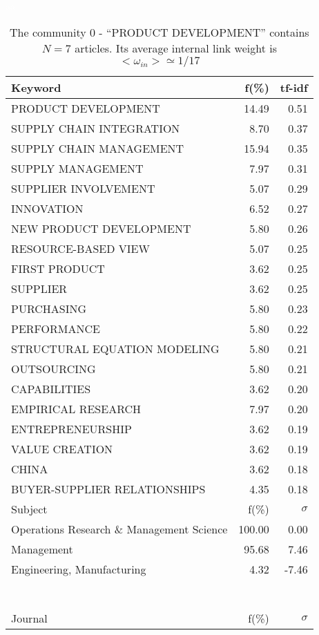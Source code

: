 \documentclass[a4paper,11pt]{report}
\begin{document}
\begin{landscape}
\begin{table}[!ht]
\caption{The community 0 - ``PRODUCT DEVELOPMENT'' contains $N = 7$ articles. Its average internal link weight is $<\omega_{in}> \simeq 1/17$ }
\textcolor{white}{aa}\\
{\scriptsize\begin{tabular}{|l r  r|}
\hline
Keyword & f(\%) & tf-idf \\
\hline
PRODUCT DEVELOPMENT & 14.49 & 0.51\\
SUPPLY CHAIN INTEGRATION & 8.70 & 0.37\\
SUPPLY CHAIN MANAGEMENT & 15.94 & 0.35\\
SUPPLY MANAGEMENT & 7.97 & 0.31\\
SUPPLIER INVOLVEMENT & 5.07 & 0.29\\
INNOVATION & 6.52 & 0.27\\
NEW PRODUCT DEVELOPMENT & 5.80 & 0.26\\
RESOURCE-BASED VIEW & 5.07 & 0.25\\
FIRST PRODUCT & 3.62 & 0.25\\
SUPPLIER & 3.62 & 0.25\\
PURCHASING & 5.80 & 0.23\\
PERFORMANCE & 5.80 & 0.22\\
STRUCTURAL EQUATION MODELING & 5.80 & 0.21\\
OUTSOURCING & 5.80 & 0.21\\
CAPABILITIES & 3.62 & 0.20\\
EMPIRICAL RESEARCH & 7.97 & 0.20\\
ENTREPRENEURSHIP & 3.62 & 0.19\\
VALUE CREATION & 3.62 & 0.19\\
CHINA & 3.62 & 0.18\\
BUYER-SUPPLIER RELATIONSHIPS & 4.35 & 0.18\\
\hline
\hline
Subject & f(\%) & $\sigma$\\
\hline
Operations Research \& Management Science & 100.00 & 0.00\\
Management & 95.68 & 7.46\\
Engineering, Manufacturing & 4.32 & -7.46\\
 &  & \\
 &  & \\
 &  & \\
 &  & \\
 &  & \\
 &  & \\
 &  & \\
\hline
\hline
Journal & f(\%) & $\sigma$\\

\end{tabular}}
\end{table}
\end{landscape}
\end{document}
